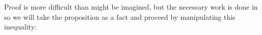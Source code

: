 
\indent Proof is more difficult than might be imagined, but
the necessary work is done in \cite{BufferStockTheory} so we will take
the proposition as a fact and proceed by manipulating this inequality:
